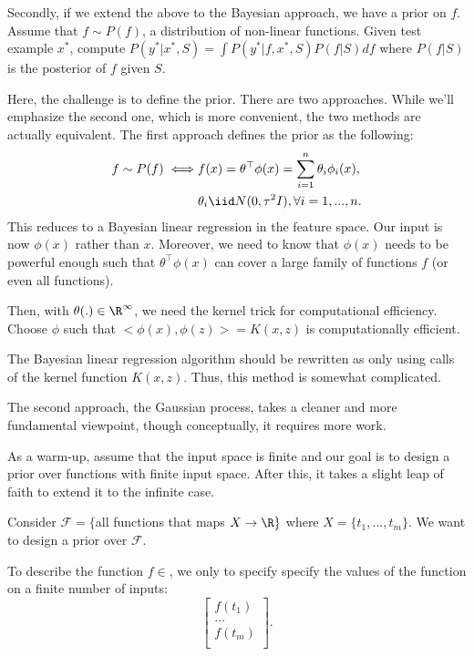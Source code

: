 Secondly, if we extend the above to the Bayesian approach, we have a prior on $f$. Assume that $f \sim P(f)$, a distribution of non-linear functions. Given test example $x^*$, compute $P(y^* | x^*, S) = \int P(y^* | f, x^*, S) P(f | S) df$ where $P(f | S)$ is the posterior of $f$ given $S$. 

Here, the challenge is to define the prior. There are two approaches. While we'll emphasize the second one, which is more convenient, the two methods are actually equivalent. 
The first approach defines the prior as the following:
\begin{equation*} \label{eq1}
	\begin{split}
		f \sim P(f) \iff & f(x) = \theta^\top \phi(x) = \sum_{i = 1}^n \theta_i \phi_i(x), \\
		& \theta_i \iid N(0, \tau^2 I), \forall i = 1, ..., n.
	\end{split}
\end{equation*}
This reduces to a Bayesian linear regression in the feature space. Our input is now $\phi(x)$ rather than $x$. Moreover, we need to know that $\phi(x)$ needs to be powerful enough such that $\theta^\top \phi(x)$ can cover a large family of functions $f$ (or even all functions). 

Then, with $\theta(.) \in \R^\infty$, we need the kernel trick for computational efficiency. Choose $\phi$ such that $<\phi(x), \phi(z)> = K(x, z)$ is computationally efficient. 

The Bayesian linear regression algorithm should be rewritten as only using calls of the kernel function $K(x, z)$. Thus, this method is somewhat complicated. 

The second approach, the Gaussian process, takes a cleaner and more fundamental viewpoint, though conceptually, it requires more work. 

As a warm-up, assume that the input space is finite and our goal is to design a prior over functions with finite input space. After this, it takes a slight leap of faith to extend it to the infinite case. 

Consider $\mathcal{F} = \{$all functions that maps $X \rightarrow \R\}$ where $X = \{t_1, ..., t_m\}$. We want to design a prior over $\mathcal{F}$.

To describe the function $f \in $, we only to specify specify the values of the function on a finite number of inputs: 
$$\begin{bmatrix}
	f(t_1)\\
	...\\
	f(t_m)\\
\end{bmatrix}.$$

